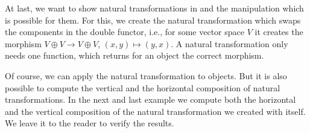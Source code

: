 \begin{small}

\end{small}

At last, we want to show natural transformations in \CapPkg and the manipulation which is possible for them. For this, we create the natural transformation which
swaps the components in the double functor, i.e., for some vector space $V$ it creates the morphism $V \oplus V \rightarrow V \oplus V$, $\left( x,y \right) \mapsto \left( y,x \right)$.
A natural transformation only needs one function, which returns for an object the correct morphism.



Of course, we can apply the natural transformation to objects. But it is also possible to compute the vertical and the horizontal composition of natural transformations.
In the next and last example we compute both the horizontal and the vertical composition of the natural transformation we created with itself. We leave it to the
reader to verify the results.

\begin{small}

\end{small}